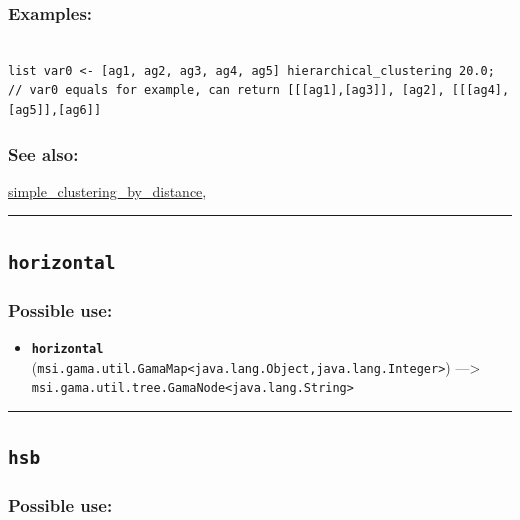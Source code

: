 \documentclass[]{book}
\providecommand{\tightlist}{%
  \setlength{\itemsep}{0pt}\setlength{\parskip}{0pt}}
\theoremstyle{definition}
\theoremstyle{definition}
\theoremstyle{definition}
\theoremstyle{remark}
\begin{document}
\subsubsection{Examples:}\label{examples-199}

\begin{verbatim}
 
list var0 <- [ag1, ag2, ag3, ag4, ag5] hierarchical_clustering 20.0; // var0 equals for example, can return [[[ag1],[ag3]], [ag2], [[[ag4],[ag5]],[ag6]]
\end{verbatim}

\subsubsection{See also:}\label{see-also-112}

\href{operators-s-to-z.html\#simple_clustering_by_distance}{simple\_clustering\_by\_distance},

\begin{center}\rule{0.5\linewidth}{\linethickness}\end{center}

\subsection{\texorpdfstring{\texttt{horizontal}}{horizontal}}\label{horizontal}

\subsubsection{Possible use:}\label{possible-use-260}

\begin{itemize}
\tightlist
\item
  \textbf{\texttt{horizontal}}
  (\texttt{msi.gama.util.GamaMap\textless{}java.lang.Object,java.lang.Integer\textgreater{}})
  ---\textgreater{}
  \texttt{msi.gama.util.tree.GamaNode\textless{}java.lang.String\textgreater{}}
\end{itemize}

\begin{center}\rule{0.5\linewidth}{\linethickness}\end{center}

\subsection{\texorpdfstring{\texttt{hsb}}{hsb}}\label{hsb}

\subsubsection{Possible use:}\label{possible-use-261}
\end{document}
